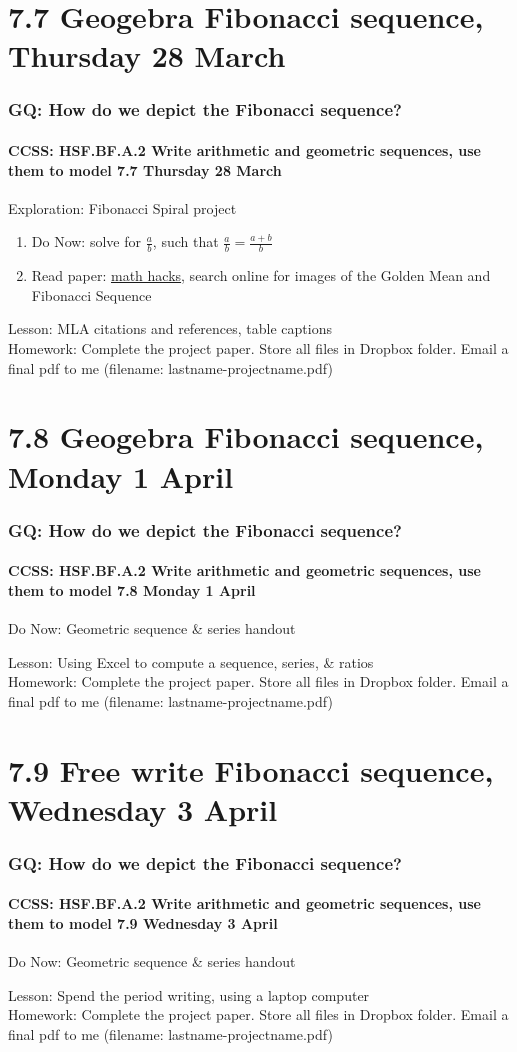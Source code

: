 \documentclass{beamer}
\begin{document}
\section{7.7 Geogebra Fibonacci sequence, Thursday 28 March}
  \frame
  {
    \frametitle{GQ: How do we depict the Fibonacci sequence?}
    \framesubtitle{CCSS: HSF.BF.A.2 Write arithmetic and geometric sequences, use them to model \hfill \alert{7.7 Thursday 28 March}}

    \begin{block}{Exploration: Fibonacci Spiral project}
      \begin{enumerate}
        \item Do Now: solve for $\frac{a}{b}$, such that $\frac{a}{b}=\frac{a+b}{b}$
        \item Read paper: \href{
        https://medium.com/i-math/what-is-the-golden-ratio-d3cc17c8fefd}{math hacks}, search online for images of the Golden Mean and Fibonacci Sequence
    \end{enumerate}
    \end{block}
    Lesson: MLA citations and references, table captions \\
    Homework: Complete the project paper. Store all files in Dropbox folder. Email a final pdf to me (filename: lastname-projectname.pdf)
  }

  \section{7.8 Geogebra Fibonacci sequence, Monday 1 April}
    \frame
    {
      \frametitle{GQ: How do we depict the Fibonacci sequence?}
      \framesubtitle{CCSS: HSF.BF.A.2 Write arithmetic and geometric sequences, use them to model \hfill \alert{7.8 Monday 1 April}}

      \begin{block}{Do Now: Geometric sequence \& series handout}
      \end{block}
      Lesson: Using Excel to compute a sequence, series, \& ratios\\
      Homework: Complete the project paper. Store all files in Dropbox folder. Email a final pdf to me (filename: lastname-projectname.pdf)
    }

\section{7.9 Free write Fibonacci sequence, Wednesday 3 April}
  \frame
  {
    \frametitle{GQ: How do we depict the Fibonacci sequence?}
    \framesubtitle{CCSS: HSF.BF.A.2 Write arithmetic and geometric sequences, use them to model \hfill \alert{7.9 Wednesday 3 April}}

    \begin{block}{Do Now: Geometric sequence \& series handout}
    \end{block}
    Lesson: Spend the period writing, using a laptop computer\\
    Homework: Complete the project paper. Store all files in Dropbox folder. Email a final pdf to me (filename: lastname-projectname.pdf)
  }
\end{document}
